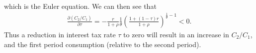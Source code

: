 \documentclass{article}
\begin{document}
\begin{itemize}
            which is the Euler equation. We can then see that
            \begin{align}
                \frac{\partial (C_2 / C_1)}{\partial \tau}
                = -\frac{r}{1+\rho}\frac{1}{\theta}\left(\frac{1 + (1-\tau)r}{1+\rho}\right)^{\frac{1}{\theta} - 1}
                < 0.
            \end{align}
            Thus a reduction in interest tax rate $\tau$ to zero will result in an increase in $C_2/C_1$, and the first period consumption  (relative to the second period).
            
            
            
            
        \end{itemize}
        
\end{document}
